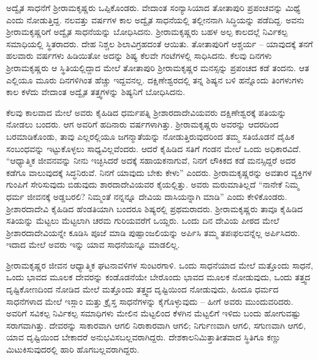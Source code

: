 ಅದ್ವೈತ ಸಾಧನೆಗೆ ಶ‍್ರೀರಾಮಕೃಷ್ಣರು ಒಪ್ಪಿಕೊಂಡರು. ವೇದಾಂತ ಸಂನ್ಯಾಸಿಯಾದ ತೋತಾಪುರಿ ಪ್ರಪಂಚವನ್ನು ಮಿಥ್ಯೆ ಎಂದು ನೋಡುತ್ತಿದ್ದ. ನಲವತ್ತು ವರ್ಷಗಳ ಕಾಲ ಅದ್ವೈತ ಸಾಧನೆಯಲ್ಲಿ ತಲ್ಲೀನನಾಗಿ ಸಿದ್ಧಿಯನ್ನು ಪಡೆದಿದ್ದ. ಅವನು ಶ‍್ರೀರಾಮಕೃಷ್ಣರಿಗೆ ಅದ್ವೈತ ಸಾಧನೆಯನ್ನು ಬೋಧಿಸಿದನು. ಶ‍್ರೀರಾಮಕೃಷ್ಣರು ಬಹಳ ಅಲ್ಪ ಕಾಲದಲ್ಲೆ ನಿರ್ವಿಕಲ್ಪ ಸಮಾಧಿಯಲ್ಲಿ ಸ್ಥಿತರಾದರು. ದೇಹ ನಿಶ್ಚಲ ಶಿಲಾವಿಗ್ರಹದಂತೆ ಆಯಿತು. ತೋತಾಪುರಿಗೆ ಆಶ್ಚರ್ಯ – ಯಾವುದಕ್ಕೆ ತನಗೆ ಹಲವಾರು ವರ್ಷಗಳು ಹಿಡಿಯಿತೋ ಅದನ್ನು ಶಿಷ್ಯ ಕೆಲವೇ ಗಂಟೆಗಳಲ್ಲಿ ಸಾಧಿಸಿದನು. ಕೆಲವು ದಿನಗಳು ಶ‍್ರೀರಾಮಕೃಷ್ಣರು ಆ ಸ್ಥಿತಿಯಲ್ಲಿದ್ದಾದ ಮೇಲೆ ತೋತಾಪುರಿ ಶ‍್ರೀರಾಮಕೃಷ್ಣರ ಮನಸ್ಸನ್ನು ಪ್ರಪಂಚದ ಕಡೆ ತಂದನು. ಆತ ಎಲ್ಲಿಯೂ ಮೂರು ದಿನಗಳಿಗಿಂತ ಹೆಚ್ಚು ಇದ್ದವನಲ್ಲ. ದಕ್ಷಿಣೇಶ್ವರದಲ್ಲಿ ತನ್ನ ಶಿಷ್ಯನ ಬಳಿ ಹನ್ನೊಂದು ತಿಂಗಳುಗಳು ಕಾಲ ಕಳೆದು ವೇದಾಂತ ಅದ್ವೈತ ತತ್ತ್ವಗಳನ್ನು ಶಿಷ್ಯನಿಗೆ ಬೋಧಿಸಿದನು.

ಕೆಲವು ಕಾಲವಾದ ಮೇಲೆ ಅವರು ಕೈಹಿಡಿದ ಧರ್ಮಪತ್ನಿ ಶ‍್ರೀಶಾರದಾದೇವಿ\break ಯವರು ದಕ್ಷಿಣೇಶ್ವರಕ್ಕೆ ಪತಿಯನ್ನು ನೋಡಲು ಬಂದರು. ಆಗ ಅವರಿಗೆ ಹದಿನಾರು ವರ್ಷಗಳಾಗಿತ್ತು. ಶ‍್ರೀರಾಮಕೃಷ್ಣರು ಅವರನ್ನು ಆದರದಿಂದ ಬರಮಾಡಿಕೊಂಡು, ತಾವು ಎಲ್ಲರಲ್ಲಿಯೂ ಜಗನ್ಮಾತೆಯನ್ನು ನೋಡುತ್ತಿರುವುದರಿಂದ ತಮ್ಮ ಸತಿಯೊಡನೆ ದೈಹಿಕ ಸಂಬಂಧವನ್ನು ಇಟ್ಟುಕೊಳ್ಳಲು ಸಾಧ್ಯವಿಲ್ಲವೆಂದರು. ಆದರೆ ಕೈಹಿಡಿದ ಸತಿಗೆ ಗಂಡನ ಮೇಲೆ ಒಂದು ಅಧಿಕಾರವಿದೆ. “ಆಧ್ಯಾತ್ಮಿಕ ಜೀವನವನ್ನು ನೀನು ಇಚ್ಛಿಸಿದರೆ ಅದಕ್ಕೆ ಸಹಾಯಕನಾಗುವೆ, ನಿನಗೆ ಲೌಕಿಕದ ಕಡೆ ಮನಸ್ಸಿದ್ದರೆ ಅದರ ಕಡೆಗೂ ವಾಲುವುದಕ್ಕೆ ಸಿದ್ಧನಿರುವೆ. ನಿನಗೆ ಯಾವುದು ಬೇಕು ಕೇಳು” ಎಂದರು. ಶ‍್ರೀರಾಮಕೃಷ್ಣರನ್ನು ಅವತಾರ ವ್ಯಕ್ತಿಗಳ ಗುಂಪಿಗೆ ಸೇರಿಸುವುದು ಬಿಡುವುದು ಶಾರದಾದೇವಿಯವರ ಕೈಯಲ್ಲಿತ್ತು. ಅವರು ಮರುಮಾತಿಲ್ಲದೆ “ನಾನೇಕೆ ನಿಮ್ಮ ಧರ್ಮ ಜೀವನಕ್ಕೆ ಅಡ್ಡಬರಲಿ? ನಿಮ್ಮಂತೆ ನನ್ನನ್ನೂ ದೇವಿಯ ದಾಸಿಯನ್ನಾಗಿ ಮಾಡಿ” ಎಂದು ಕೇಳಿಕೊಂಡರು. ಶ‍್ರೀಶಾರದಾದೇವಿ ಕೈಹಿಡಿದ ಹೆಂಡತಿಯಾಗಿ ಬಂದರೂ ಶಿಷ್ಯರಲ್ಲಿ ಪ್ರಥಮರಾದರು. ಶ‍್ರೀರಾಮಕೃಷ್ಣರು ತಾವೂ ಕೈಹಿಡಿದ ಸತಿಯನ್ನು ಮೆಟ್ಟಲು ಮೆಟ್ಟಲಾಗಿ ಚರಮ ಗುರಿಯವರೆಗೆ ಒಯ್ದರು. ಒಂದು ದಿನ ದೇವಿಯ ಪೀಠದ ಮೇಲೆ ಶ‍್ರೀಶಾರದಾದೇವಿಯನ್ನೇ ಕೂಡಿಸಿ ಪೂಜೆ ಮಾಡಿ ಪುಷ್ಪಾಂಜಲಿಯನ್ನು ಅರ್ಪಿಸಿ ತಮ್ಮ ತಪಃಫಲವನ್ನೆಲ್ಲ ಅರ್ಪಿಸಿದರು. ಇದಾದ ಮೇಲೆ ಅವರು ಇನ್ನು ಯಾವ ಸಾಧನೆಯನ್ನೂ ಮಾಡಲಿಲ್ಲ.

ಶ‍್ರೀರಾಮಕೃಷ್ಣರ ಜೀವನ ಆಧ್ಯಾತ್ಮಿಕ ಘಟನಾವಳಿಗಳ ಸುಂಟರಗಾಳಿ. ಒಂದು ಸಾಧನೆಯಾದ ಮೇಲೆ ಮತ್ತೊಂದು ಸಾಧನೆ, ಒಂದು ಭಾವದ ಮೂಲಕ ದೇವರನ್ನು ಕಂಡೊಡನೆಯೇ ಬೇರೊಂದು ಭಾವದ ಮೂಲಕ ನೋಡುವುದು, ಒಂದು ತತ್ತ್ವದ ದೃಷ್ಟಿಕೋಣದಿಂದ ನೋಡಿದ ಮೇಲೆ ಮತ್ತೊಂದು ತತ್ತ್ವದ ದೃಷ್ಟಿಯಿಂದ ನೋಡುವುದು, ಹಿಂದೂ ಧರ್ಮದ ಸಾಧನೆಗಳಾದ ಮೇಲೆ ಇಸ್ಲಾಂ ಮತ್ತು ಕ್ರೈಸ್ತ ಸಾಧನೆಗಳನ್ನು ಕೈಗೊಳ್ಳುವುದು – ಹೀಗೆ ಅವರು ಮುಂದುವರಿದರು. ಅವರಿಗೆ ಸವಿಕಲ್ಪ ನಿರ್ವಿಕಲ್ಪ ಸಮಾಧಿಗಳು ಮೇಲಿನ ಮೆಟ್ಟಲಿಂದ ಕೆಳಗಿನ ಮೆಟ್ಟಲಿಗೆ ಇಳಿದು ಬಂದು ಹೋಗುವಷ್ಟು ಸರಾಗವಾಗಿತ್ತು. ದೇವರನ್ನು ಸಾಕಾರವಾಗಿ ಆಗಲಿ ನಿರಾಕಾರವಾಗಿ ಆಗಲಿ; ನಿರ್ಗುಣವಾಗಿ ಆಗಲಿ, ಸಗುಣವಾಗಿ ಆಗಲಿ, ಯಾವ ದೃಷ್ಟಿಯಿಂದ ಬೇಕಾದರೆ ಅನುಭವಿಸಬಲ್ಲವರಾಗಿದ್ದರು. ದೇಶಕಾಲನಿಮಿತ್ತಾತೀತವಾದ ಸ್ಥಿತಿಗೂ ಕಣ್ಣು ಮಿಟುಕಿಸುವುದರಲ್ಲಿ ಹಾರಿ ಹೊಗಬಲ್ಲವರಾಗಿದ್ದರು.

